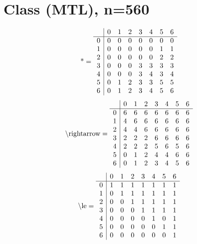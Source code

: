 \documentclass[11pt]{article}
\begin{document}
\section{Class (MTL), n=560}
\[\text{*} = 
\begin{array}{r | r r r r r r r}
 & 0 & 1 & 2 & 3 & 4 & 5 & 6 \\ \hline
0 & 0 & 0 & 0 & 0 & 0 & 0 & 0 \\
1 & 0 & 0 & 0 & 0 & 0 & 1 & 1 \\
2 & 0 & 0 & 0 & 0 & 0 & 2 & 2 \\
3 & 0 & 0 & 0 & 3 & 3 & 3 & 3 \\
4 & 0 & 0 & 0 & 3 & 4 & 3 & 4 \\
5 & 0 & 1 & 2 & 3 & 3 & 5 & 5 \\
6 & 0 & 1 & 2 & 3 & 4 & 5 & 6 \\
\end{array}
\]
\[\text{\textbackslash rightarrow} = 
\begin{array}{r | r r r r r r r}
 & 0 & 1 & 2 & 3 & 4 & 5 & 6 \\ \hline
0 & 6 & 6 & 6 & 6 & 6 & 6 & 6 \\
1 & 4 & 6 & 6 & 6 & 6 & 6 & 6 \\
2 & 4 & 4 & 6 & 6 & 6 & 6 & 6 \\
3 & 2 & 2 & 2 & 6 & 6 & 6 & 6 \\
4 & 2 & 2 & 2 & 5 & 6 & 5 & 6 \\
5 & 0 & 1 & 2 & 4 & 4 & 6 & 6 \\
6 & 0 & 1 & 2 & 3 & 4 & 5 & 6 \\
\end{array}
\]
\[\text{\textbackslash le} = 
\begin{array}{r | r r r r r r r}
 & 0 & 1 & 2 & 3 & 4 & 5 & 6 \\ \hline
0 & 1 & 1 & 1 & 1 & 1 & 1 & 1 \\
1 & 0 & 1 & 1 & 1 & 1 & 1 & 1 \\
2 & 0 & 0 & 1 & 1 & 1 & 1 & 1 \\
3 & 0 & 0 & 0 & 1 & 1 & 1 & 1 \\
4 & 0 & 0 & 0 & 0 & 1 & 0 & 1 \\
5 & 0 & 0 & 0 & 0 & 0 & 1 & 1 \\
6 & 0 & 0 & 0 & 0 & 0 & 0 & 1 \\
\end{array}
\]
\end{document}
